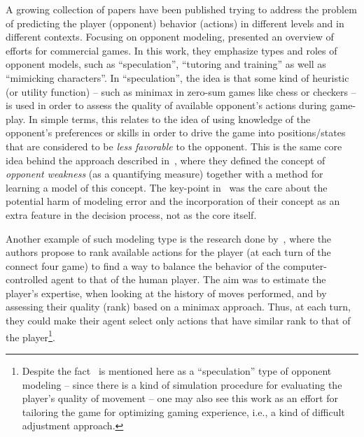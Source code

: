 A growing collection of papers have been published trying to address the problem of predicting the player (opponent) behavior (actions) in different levels and in different contexts. Focusing on opponent modeling, \cite{herik_opponent_2005} presented an overview of efforts for commercial games. In this work, they emphasize types and roles of opponent models, such as ``speculation'', ``tutoring and training'' as well as ``mimicking characters''. In ``speculation'', the idea is that some kind of heuristic (or utility function) -- such as minimax in zero-sum games like chess or checkers -- is used in order to assess the quality of available opponent's actions during game-play. In simple terms, this relates to the idea of using knowledge of the opponent's preferences or skills in order to drive the game into positions/states that are considered to be \textit{less favorable} to the opponent. This is the same core idea behind the approach described in~\cite{markovitch_learning_2005}, where they defined the concept of \textit{opponent weakness} (as a quantifying measure) together with a method for learning a model of this concept. The key-point in~\cite{markovitch_learning_2005} was the care about the potential harm of modeling error and the incorporation of their concept as an extra feature in the decision process, not as the core itself.

Another example of such modeling type is the research done by~\cite{missura_online_2008}, where the authors propose to rank available actions for the player (at each turn of the connect four game) to find a way to balance the behavior of the computer-controlled agent to that of the human player. The aim was to estimate the player's expertise, when looking at the history of moves performed, and by assessing their quality (rank) based on a minimax approach.  Thus, at each turn, they could make their agent select only actions that have similar rank to that of the player\footnote{Despite the fact~\cite{missura_online_2008} is mentioned here as a ``speculation'' type of opponent modeling -- since there is a kind of simulation procedure for evaluating the player's quality of movement -- one may also see this work as an effort for tailoring the game for optimizing gaming experience, i.e., a kind of difficult adjustment approach.}.

